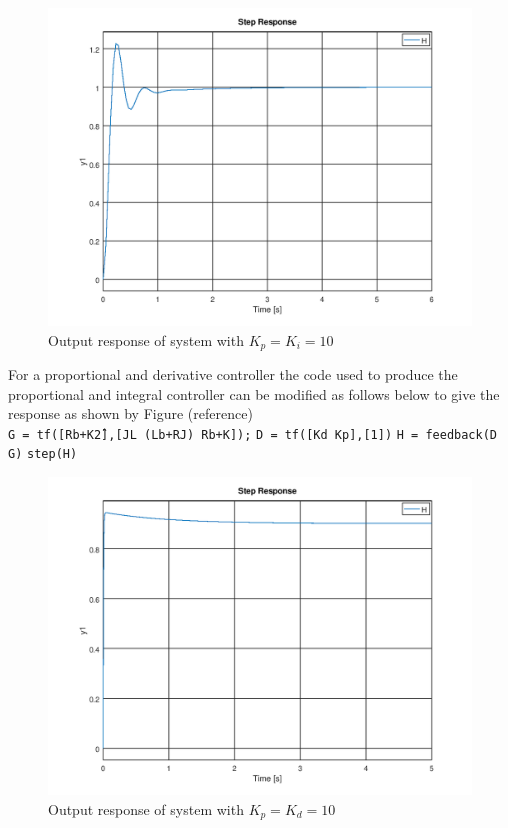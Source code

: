 \documentclass[a4paper, 12pt]{article}
\begin{document}
\begin{figure}[H]
	\centering
	\includegraphics[width=\textwidth]{Images/question_4_output_response_PI.png}
	\caption{Output response of system with $K_p=K_i=10$}
	\label{fig:question_4_output_response_pi}
\end{figure}

For a proportional and derivative controller the code used to produce the proportional and integral controller can be modified as follows below to give the response as shown by Figure (reference)\\
\noindent
\texttt{G = tf([R\*b+K\^2],[J\*L (L\*b+R\*J) R\*b+K]);}
\texttt{D = tf([Kd Kp],[1])}
\texttt{H = feedback(D \* G)}
\texttt{step(H)}

\begin{figure}[H]
	\centering
	\includegraphics[width=\textwidth]{Images/question_4_output_response_PD.png}
	\caption{Output response of system with $K_p=K_d=10$}
	\label{fig:question_4_output_response_pd}
\end{figure}
\end{document}
